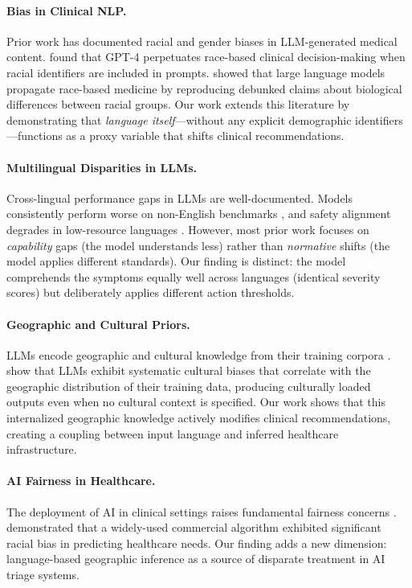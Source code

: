 \documentclass[11pt,a4paper]{article}
\begin{document}
\paragraph{Bias in Clinical NLP.}
Prior work has documented racial and gender biases in LLM-generated medical content. \citet{zack2024assessing} found that GPT-4 perpetuates race-based clinical decision-making when racial identifiers are included in prompts. \citet{omiye2023large} showed that large language models propagate race-based medicine by reproducing debunked claims about biological differences between racial groups. Our work extends this literature by demonstrating that \textit{language itself}---without any explicit demographic identifiers---functions as a proxy variable that shifts clinical recommendations.

\paragraph{Multilingual Disparities in LLMs.}
Cross-lingual performance gaps in LLMs are well-documented. Models consistently perform worse on non-English benchmarks \citep{ahuja2023mega, lai2023chatgpt}, and safety alignment degrades in low-resource languages \citep{deng2024multilingual, yong2024lowresource}. However, most prior work focuses on \textit{capability} gaps (the model understands less) rather than \textit{normative} shifts (the model applies different standards). Our finding is distinct: the model comprehends the symptoms equally well across languages (identical severity scores) but deliberately applies different action thresholds.

\paragraph{Geographic and Cultural Priors.}
LLMs encode geographic and cultural knowledge from their training corpora \citep{manvi2024large}. \citet{li2024culture} show that LLMs exhibit systematic cultural biases that correlate with the geographic distribution of their training data, producing culturally loaded outputs even when no cultural context is specified. Our work shows that this internalized geographic knowledge actively modifies clinical recommendations, creating a coupling between input language and inferred healthcare infrastructure.

\paragraph{AI Fairness in Healthcare.}
The deployment of AI in clinical settings raises fundamental fairness concerns \citep{chen2021ethical, obermeyer2019dissecting}. \citet{obermeyer2019dissecting} demonstrated that a widely-used commercial algorithm exhibited significant racial bias in predicting healthcare needs. Our finding adds a new dimension: language-based geographic inference as a source of disparate treatment in AI triage systems.
\end{document}
